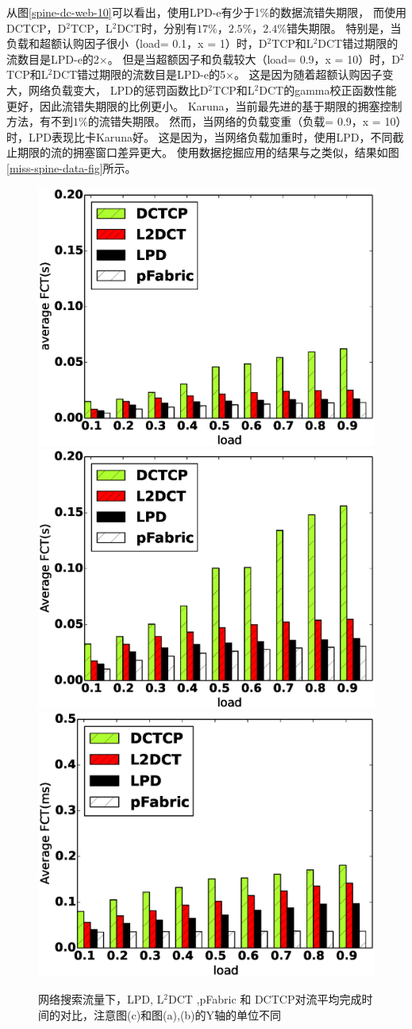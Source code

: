 从图\ref{spine-dc-web-10}可以看出，使用LPD-e有少于1$\%$的数据流错失期限，
而使用DCTCP，D$^2$TCP，L$^2$DCT时，分别有$17\%$，$2.5\%$，$2.4\%$错失期限。
特别是，当负载和超额认购因子很小（load= 0.1，x = 1）时，D$^2$TCP和L$^2$DCT错过期限的流数目是LPD-e的2$\times$。
但是当超额因子和负载较大（load= 0.9，x = 10）时，D$^2$TCP和L$^2$DCT错过期限的流数目是LPD-e的5$\times$。
这是因为随着超额认购因子变大，网络负载变大，
LPD的惩罚函数比D$^2$TCP和L$^2$DCT的gamma校正函数性能更好，因此流错失期限的比例更小。
Karuna，当前最先进的基于期限的拥塞控制方法，有不到$1\%$的流错失期限。
然而，当网络的负载变重（负载= 0.9，x = 10）时，LPD表现比卡Karuna好。
这是因为，当网络负载加重时，使用LPD，不同截止期限的流的拥塞窗口差异更大。
使用数据挖掘应用的结果与之类似，结果如图\ref{miss-spine-data-fig}所示。


\begin{figure}[h]
\centering
{}
 {\includegraphics[width=0.32\columnwidth]{figures/LPD/spineleaf/FCT_SEARCH_average.eps}}
{\includegraphics[width=0.32\columnwidth]{figures/LPD/spineleaf/FCT_SEARCH_large.eps}}
{\includegraphics[width=0.32\columnwidth]{figures/LPD/spineleaf/FCT_SEARCH_small.eps}}
\caption{网络搜索流量下，LPD, L$^2$DCT ,pFabric 和 DCTCP对流平均完成时间的对比，注意图(c)和图(a),(b)的Y轴的单位不同}
\label{fct-spine-search-5-fig}
\end{figure}


